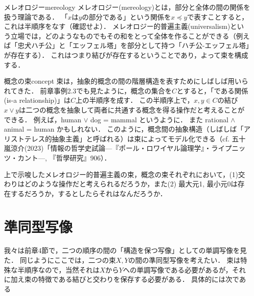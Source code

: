 \documentclass[11pt,a4paper, dvipdfmx]{jsarticle}
\begin{document}
\begin{rei}{メレオロジー}{mereology}
メレオロジー(mereology)とは，部分と全体の間の関係を扱う理論である．
「$x$は$y$の部分である」という関係を$x \preceq y$で表すことすると，これは半順序をなす（確認せよ）．
メレオロジー的普遍主義(universalism)という立場では，どのようなものでもその和をとって全体を作ることができる（例えば「忠犬ハチ公」と「エッフェル塔」を部分として持つ「ハチ公-エッフェル塔」が存在する）．
これはつまり結びが存在するということであり，よって束を構成する．
\end{rei}

\begin{rei}{概念の束}{concept}
束は，抽象的概念の間の階層構造を表すためにしばしば用いられてきた．
前章事例2.3でも見たように，概念の集合を$C$とすると，「である関係(is-a relationship)」は$C$上の半順序を成す．
この半順序上で，$x, y \in C$の結び$x \vee y$は二つの概念を抽象して両者に共通する概念を得る操作だと考えることができる．
例えば，human $\vee$ dog = mammal というように．
また rational $\wedge$ animal = human かもしれない．
このように，概念間の抽象構造（しばしば「アリストテレス的抽象主義」と呼ばれる）は束によってモデル化できる（cf. 五十嵐涼介(2023)「情報の哲学史試論---『ポール・ロワイヤル論理学』・ライプニッツ・カント---, 『哲學研究』906）．
\end{rei}

\begin{renshu}{}{}
上で示唆したメレオロジー的普遍主義の束，概念の束それぞれにおいて，(1)交わりはどのような操作だと考えられるだろうか，また(2) 最大元1, 最小元0は存在するだろうか，するとしたらそれはなんだろうか．
\end{renshu}

\section{準同型写像}
我々は前章4節で，二つの順序の間の「構造を保つ写像」としての単調写像を見た．
同じようにここでは，二つの束$X, Y$の間の準同型写像を考えたい．
束は特殊な半順序なので，当然それは$X$から$Y$への単調写像である必要があるが，それに加え束の特徴である結びと交わりを保存する必要がある．
具体的には次である
\end{document}
